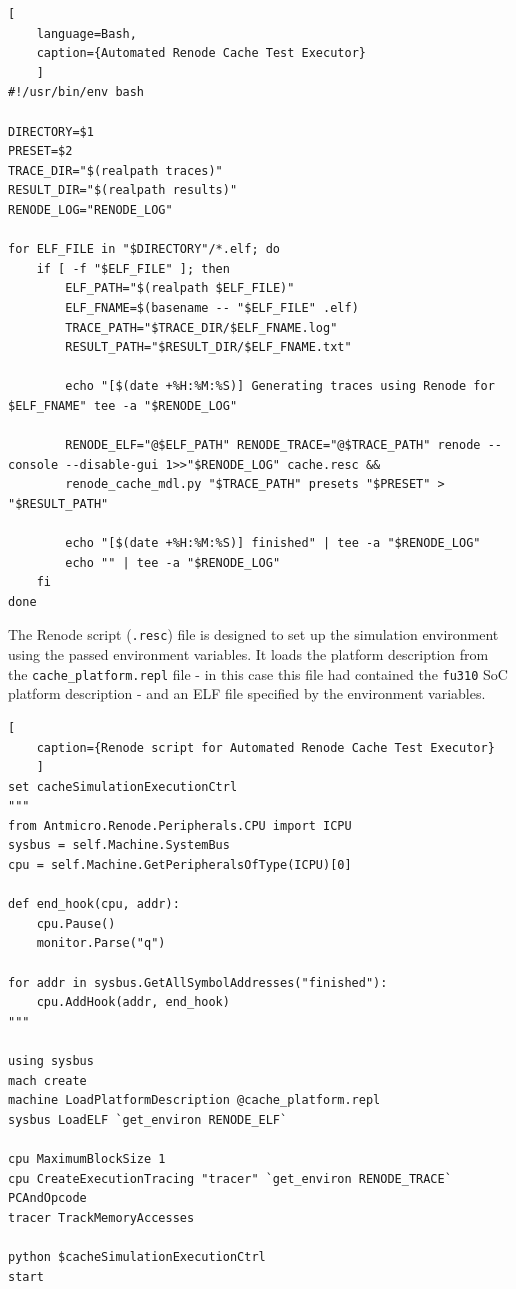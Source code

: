 \begin{center}
\centering
\begin{minipage}{\linewidth}
\begin{lstlisting}[
    language=Bash,
    caption={Automated Renode Cache Test Executor}
    ]
#!/usr/bin/env bash

DIRECTORY=$1
PRESET=$2
TRACE_DIR="$(realpath traces)"
RESULT_DIR="$(realpath results)"
RENODE_LOG="RENODE_LOG"

for ELF_FILE in "$DIRECTORY"/*.elf; do
	if [ -f "$ELF_FILE" ]; then
		ELF_PATH="$(realpath $ELF_FILE)"
		ELF_FNAME=$(basename -- "$ELF_FILE" .elf)
		TRACE_PATH="$TRACE_DIR/$ELF_FNAME.log"
		RESULT_PATH="$RESULT_DIR/$ELF_FNAME.txt"

		echo "[$(date +%H:%M:%S)] Generating traces using Renode for $ELF_FNAME" tee -a "$RENODE_LOG"

		RENODE_ELF="@$ELF_PATH" RENODE_TRACE="@$TRACE_PATH" renode --console --disable-gui 1>>"$RENODE_LOG" cache.resc &&
		renode_cache_mdl.py "$TRACE_PATH" presets "$PRESET" > "$RESULT_PATH"

		echo "[$(date +%H:%M:%S)] finished" | tee -a "$RENODE_LOG"
		echo "" | tee -a "$RENODE_LOG"
	fi
done
\end{lstlisting}
\end{minipage}
\end{center}

\noindent The Renode script (\texttt{.resc}) file is designed to set up the simulation environment using the passed environment variables. It loads the platform description from
the \texttt{cache\_platform.repl} file - in this case this file had contained the \texttt{fu310} SoC platform description - and an ELF file specified by the environment variables.


\begin{center}
\centering
\begin{minipage}{\linewidth}
\begin{lstlisting}[
    caption={Renode script for Automated Renode Cache Test Executor}
    ]
set cacheSimulationExecutionCtrl
"""
from Antmicro.Renode.Peripherals.CPU import ICPU
sysbus = self.Machine.SystemBus
cpu = self.Machine.GetPeripheralsOfType(ICPU)[0]

def end_hook(cpu, addr):
    cpu.Pause()
    monitor.Parse("q")

for addr in sysbus.GetAllSymbolAddresses("finished"):
    cpu.AddHook(addr, end_hook)
"""

using sysbus
mach create
machine LoadPlatformDescription @cache_platform.repl
sysbus LoadELF `get_environ RENODE_ELF`

cpu MaximumBlockSize 1
cpu CreateExecutionTracing "tracer" `get_environ RENODE_TRACE` PCAndOpcode
tracer TrackMemoryAccesses

python $cacheSimulationExecutionCtrl
start
\end{lstlisting}
\end{minipage}
\end{center}

